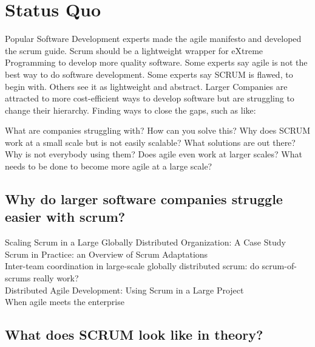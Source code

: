 % 
\section*{Status Quo}

Popular Software Development experts made the agile manifesto and developed the scrum guide. Scrum should be a lightweight wrapper for eXtreme Programming to develop more quality software. Some experts say agile is not the best way to do software development. Some experts say SCRUM is flawed, to begin with. Others see it as lightweight and abstract. Larger Companies are attracted to more cost-efficient ways to develop software but are struggling to change their hierarchy. Finding ways to close the gaps, such as like: 

What are companies struggling with? How can you solve this? Why does SCRUM work at a small scale but is not easily scalable? What solutions are out there? Why is not everybody using them? Does agile even work at larger scales? What needs to be done to become more agile at a large scale?

\subsection*{Why do larger software companies struggle easier with scrum?}

Scaling Scrum in a Large Globally Distributed Organization: A Case Study\citep{paasivaara2016scaling}\\
Scrum in Practice: an Overview of Scrum Adaptations\citep{hron2018scrum}\\
Inter-team coordination in large-scale globally distributed scrum: do scrum-of-scrums really work?\citep{paasivaara2012inter}\\
Distributed Agile Development: Using Scrum in a Large Project\citep{paasivaara2008distributed}\\
When agile meets the enterprise\citep{van2013agile}\\

\subsection*{What does SCRUM look like in theory?}

